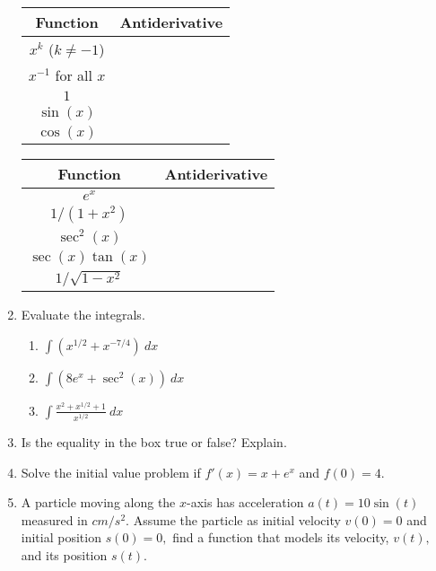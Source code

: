 \documentclass[11pt,fleqn]{article}
\def\ds{\displaystyle}
\begin{document}
\begin{enumerate}
\doublespacing
\begin{tabular}{|c|c|}\hline
Function & \quad \quad Antiderivative \quad \quad \quad \\ \hline
$\ds x^k$ ($k\neq -1$) &\\  \hline
$\ds x^{-1}$ for all $x$&\\ \hline
$\ds 1$ &\\ \hline
$\ds \sin(x)$ & \\ \hline
$\ds \cos(x)$ &\\ \hline
\end{tabular}
\quad
\begin{tabular}{|c|c|}\hline
Function & \quad \quad Antiderivative \quad \quad \quad \\ \hline
$\ds e^x$ &\\ \hline
$\ds 1/(1+x^2)$  &\\ \hline
$\ds \sec^2(x)$ &\\ \hline
$\ds \sec(x)\tan(x)$ &\\ \hline
$\ds 1/\sqrt{1-x^2}$ &\\ \hline
\end{tabular}
\singlespacing
\newpage
\item Evaluate the integrals.
	\begin{enumerate}
	\item $\displaystyle{\int( x^{1/2} + x^{-7/4})\: dx}$\\

	\item $\displaystyle{\int( 8e^{x} + \sec^2(x))\: dx}$\\
	\item $\displaystyle{\int \frac{x^2+x^{1/2}+1}{x^{1/2}}\: dx}$
	\vspace{.5in}
	\end{enumerate}
\item Is the equality in the box true or false? Explain. \hfill {}\\
\vspace{.5in}
\item Solve the initial value problem if $f'(x)=x+e^x$ and $f(0)=4.$
\vfill
\item A particle moving along the $x$-axis has acceleration $a(t)=10\sin(t)$ measured in $cm/s^2.$ Assume the particle as initial velocity $v(0)=0$ and initial position $s(0)=0,$ find a function that models its velocity, $v(t),$ and its position $s(t).$
\vfill
\end{enumerate}
\end{document}
